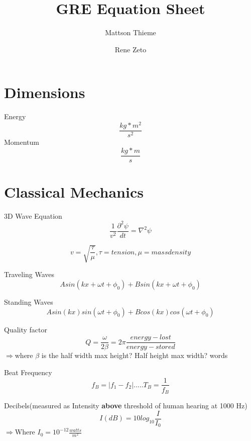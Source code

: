 \documentclass{article}
\begin{document}
\title{GRE Equation Sheet}
\author{Mattson Thieme\and Rene Zeto}
\maketitle





\section{Dimensions}
Energy\begin{equation}\frac{kg*m^2}{s^2}
\end{equation} 
Momentum\begin{equation}\frac{kg*m}{s}\end{equation}






\section{Classical Mechanics}
3D Wave Equation\begin{equation}\frac{1}{v^2} \frac{\partial^2\psi}{dt}= \nabla^2 \psi \end{equation}

\begin{equation}v=\sqrt{\frac{\tau}{\mu}},  \tau=tension, \mu=mass density \end{equation}

Traveling Waves\begin{equation}Asin(kx+\omega t + \phi_0)+Bsin(kx+\omega t +\phi_0)\end{equation}

Standing Waves\begin{equation}Asin(kx)sin(\omega t+\phi_0)+Bcos(kx)cos(\omega t+\phi_0)\end{equation}

Quality factor\begin{equation}Q=\frac{\omega}{2\beta}=2\pi \frac{energy-lost}{energy-stored}\end{equation}
$\Rightarrow$where $\beta$ is the half width max height? Half height max width? words

Beat Frequency\begin{equation}f_B=|f_1-f_2|.....T_B = \frac{1}{f_B}\end{equation}

Decibels(measured as Intensity {\bf above} threshold of human hearing at 1000 Hz)\begin{equation}I(dB)=10log_{10}\frac{I}{I_0}\end{equation}
$\Rightarrow$Where $I_0 = 10^{-12} \frac{watts}{m^2}$
\end{document}
